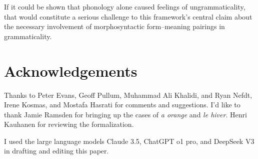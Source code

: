 \documentclass[12pt,letterpaper]{article}
\begin{document}
If it could be shown that phonology alone caused feelings of ungrammaticality, that would constitute a serious challenge to this framework's central claim about the necessary involvement of morphosyntactic form--meaning pairings in grammaticality.


\newpage
\section*{Acknowledgements}
Thanks to Peter Evans, Geoff Pullum, Muhammad Ali Khalidi, and Ryan Nefdt, Irene Kosmas, and Mostafa Hasrati for comments and suggestions. I'd like to thank Jamie Ramsden for bringing up the cases of \textit{a orange} and \textit{le hiver}. Henri Kauhanen for reviewing the formalization.

I used the large language models Claude 3.5, ChatGPT o1 pro, and DeepSeek V3 in drafting and editing this paper.

\newpage
\begin{sloppypar}
\printbibliography[title=References]
\end{sloppypar}
\end{document}
